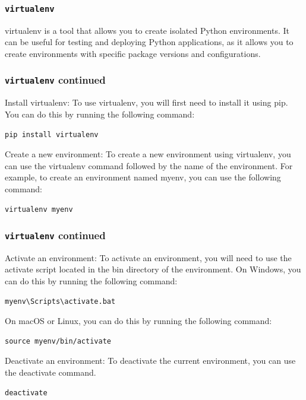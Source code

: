 \documentclass{beamer}
\begin{document}
\begin{frame}[fragile]
  \frametitle{\texttt{virtualenv}}

  virtualenv is a tool that allows you to create isolated Python environments. It can be useful for testing and deploying Python applications, as it allows you to create environments with specific package versions and configurations.

\end{frame}

\begin{frame}[fragile]
  \frametitle{\texttt{virtualenv} continued}

  Install virtualenv: To use virtualenv, you will first need to install it using pip. You can do this by running the following command:

  \begin{lstlisting}
pip install virtualenv
\end{lstlisting}

  Create a new environment: To create a new environment using virtualenv, you can use the virtualenv command followed by the name of the environment. For example, to create an environment named myenv, you can use the following command:

  \begin{lstlisting}
virtualenv myenv
\end{lstlisting}

\end{frame}

\begin{frame}[fragile]
  \frametitle{\texttt{virtualenv} continued}

  Activate an environment: To activate an environment, you will need to use the activate script located in the bin directory of the environment. On Windows, you can do this by running the following command:

  \begin{lstlisting}
myenv\Scripts\activate.bat
\end{lstlisting}

  On macOS or Linux, you can do this by running the following command:

  \begin{lstlisting}
source myenv/bin/activate
\end{lstlisting}

  Deactivate an environment: To deactivate the current environment, you can use the deactivate command.

  \begin{lstlisting}
deactivate
\end{lstlisting}

\end{frame}
\end{document}
